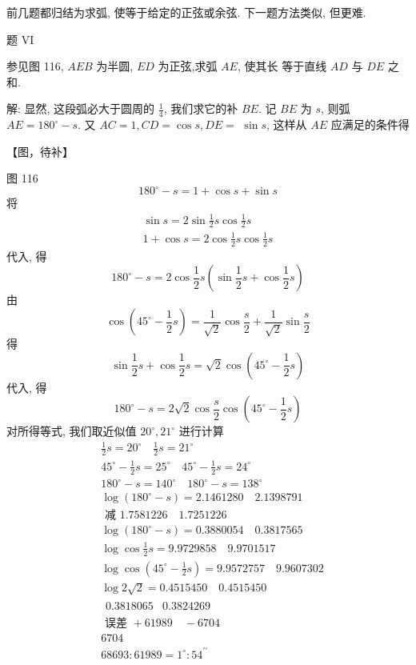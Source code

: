 前几题都归结为求弧, 使等于给定的正弦或余弦. 下一题方法类似, 但更难.

题 VI

参见图 116, $A E B$ 为半圆, $E D$ 为正弦,求弧 $A E$, 使其长 等于直线 $A D$ 与 $D E$ 之和.

解: 显然, 这段弧必大于圆周的 $\frac{1}{4}$, 我们求它的补 $B E$. 记 $B E$ 为 $s$, 则弧 $A E=180^{\circ}-s$. 又 $A C=1, C D=\cos s, D E=$ $\sin s$, 这样从 $A E$ 应满足的条件得


【图，待补】

图 116
\[
180^{\circ}-s=1+\cos s+\sin s
\]
将
\[
\begin{gathered}
\sin s=2 \sin \frac{1}{2} s \cos \frac{1}{2} s \\
1+\cos s=2 \cos \frac{1}{2} s \cos \frac{1}{2} s
\end{gathered}
\]
代入, 得
\[
180^{\circ}-s=2 \cos \frac{1}{2} s\left(\sin \frac{1}{2} s+\cos \frac{1}{2} s\right)
\]
由 
\[
\cos \left(45^{\circ}-\frac{1}{2} s\right)=\frac{1}{\sqrt{2}} \cos \frac{s}{2}+\frac{1}{\sqrt{2}} \sin \frac{s}{2}
\]
得
\[
\sin \frac{1}{2} s+\cos \frac{1}{2} s=\sqrt{2} \cos \left(45^{\circ}-\frac{1}{2} s\right)
\]
代入, 得
\[
180^{\circ}-s=2 \sqrt{2} \cos \frac{s}{2} \cos \left(45^{\circ}-\frac{1}{2} s\right)
\]
对所得等式, 我们取近似值 $20^{\circ}, 21^{\circ}$ 进行计算
\[
\begin{aligned}
& \frac{1}{2} s=20^{\circ} \quad \frac{1}{2} s=21^{\circ} \\
& 45^{\circ}-\frac{1}{2} s=25^{\circ} \quad 45^{\circ}-\frac{1}{2} s=24^{\circ} \\
& 180^{\circ}-s=140^{\circ} \quad 180^{\circ}-s=138^{\circ} \\
& \log \left(180^{\circ}-s\right)=2.1461280 \quad 2.1398791 \\
& \text { 减 } 1.7581226 \quad 1.7251226 \\
& \log \left(180^{\circ}-s\right)=0.3880054 \quad 0.3817565 \\
& \log \cos \frac{1}{2} s=9.9729858 \quad 9.9701517 \\
& \log \cos \left(45^{\circ}-\frac{1}{2} s\right)=9.9572757 \quad 9.9607302 \\
& \log 2 \sqrt{2}=0.4515450 \quad 0.4515450 \\
& \begin{array}{ll}0.3818065 & 0.3824269\end{array} \\
& \text { 误差 }+61989 \quad-6704 \\
& 6704 \\
& 68693: 61989=1^{\circ}: 54^{\prime \prime}
\end{aligned}
\]
